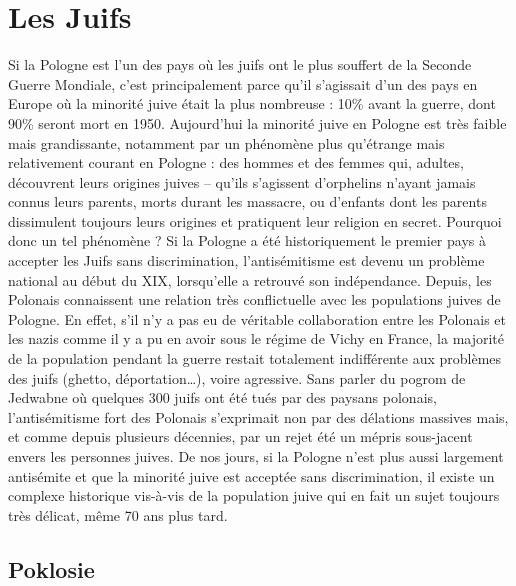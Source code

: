 \documentclass[12pt]{amsart}
\begin{document}
\section{Les Juifs}
Si la Pologne est l’un des pays où les juifs ont le plus souffert de la Seconde Guerre Mondiale, c’est principalement parce qu’il s’agissait d’un des pays en Europe où la minorité juive était la plus nombreuse : 10\% avant la guerre, dont 90\%  seront mort en 1950. Aujourd’hui la minorité juive en Pologne est très faible mais grandissante, notamment par un phénomène plus qu’étrange mais relativement courant en Pologne : des hommes et des femmes qui, adultes, découvrent leurs origines juives – qu’ils s’agissent d’orphelins n’ayant jamais connus leurs parents, morts durant les massacre, ou d’enfants dont les parents dissimulent toujours leurs origines et pratiquent leur religion en secret. Pourquoi donc un tel phénomène ? Si la Pologne a été historiquement le premier pays à accepter les Juifs sans discrimination, l’antisémitisme est devenu un problème national au début du XIX, lorsqu’elle a retrouvé son indépendance. Depuis, les Polonais connaissent une relation très conflictuelle avec les populations juives de Pologne. En effet, s’il n’y a pas eu de véritable collaboration entre les Polonais et les nazis comme il y a pu en avoir sous le régime de Vichy en France, la majorité de la population pendant la guerre restait totalement indifférente aux problèmes des juifs (ghetto, déportation…), voire agressive. Sans parler du pogrom de Jedwabne où quelques 300 juifs ont été tués par des paysans polonais, l’antisémitisme fort des Polonais s’exprimait non par des délations massives mais, et comme depuis plusieurs décennies, par un rejet été un mépris sous-jacent envers les personnes juives. De nos jours, si la Pologne n’est plus aussi largement antisémite et que la minorité juive est acceptée sans discrimination, il existe un complexe historique vis-à-vis de la population juive qui en fait un sujet toujours très délicat, même 70 ans plus tard.
\subsection*{Poklosie}
\end{document}
